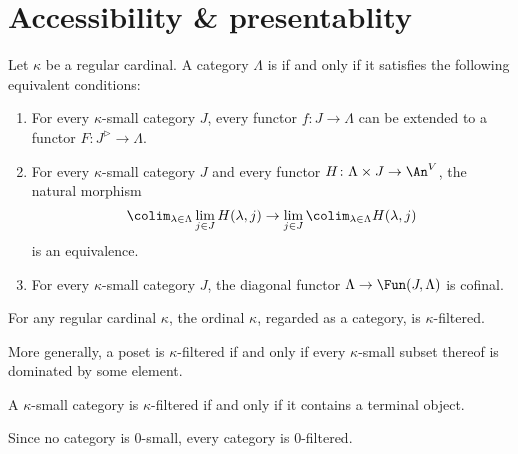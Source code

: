 
\section{Accessibility \& presentablity}%
\label{sec:accessibilityandpresentablity}

\begin{definition}
	Let $ \kappa $ be a regular cardinal.
	A category $ \Lambda $ is  if and only if
	it satisfies the following equivalent conditions:
	\begin{enumerate}
		\item For every $ \kappa $-small category $ J $,
			every functor $ f \colon J \to \Lambda $ can be extended
			to a functor $ F \colon J^{\rhd} \to \Lambda $.
		\item For every $ \kappa $-small category $ J $
			and every functor $ H \colon \Lambda \times J \to \An^V$,
			the natural morphism
			\[
				\colim_{\lambda \in \Lambda} \lim_{j \in J} H(\lambda,j)
				\to
				\lim_{j \in J} \colim_{\lambda \in \Lambda} H(\lambda,j)
			\]
			is an equivalence.
		\item For every $ \kappa $-small category $ J $,
			the diagonal functor
			$ \Lambda \to \Fun(J, \Lambda) $
			is cofinal.
	\end{enumerate}
\end{definition}

\begin{eg}
	For any regular cardinal $ \kappa $,
	the ordinal $ \kappa $, regarded as a category,
	is $ \kappa $-filtered.

	More generally, a poset is $ \kappa $-filtered if and only if
	every $ \kappa $-small subset thereof is dominated by some element.
\end{eg}

\begin{eg}
	A $ \kappa $-small category is $ \kappa $-filtered
	if and only if it contains a terminal object.
\end{eg}

\begin{eg}
	Since no category is $ 0 $-small,
	every category is $ 0 $-filtered.
\end{eg}

